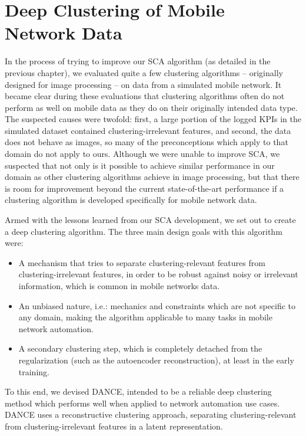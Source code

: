 \chapter{Deep Clustering of Mobile Network Data}
	\label{cha:decorr_ae}
	
	In the process of trying to improve our \ac{SCA} algorithm (as detailed in the previous chapter), we evaluated quite a few clustering algorithms -- originally designed for image processing -- on data from a simulated mobile network.
	It became clear during these evaluations that clustering algorithms often do not perform as well on mobile data as they do on their originally intended data type.
 	The suspected causes were twofold: first, a large portion of the logged \acp{KPI} in the simulated dataset contained clustering-irrelevant features, and second, the data does not behave as images, so many of the preconceptions which apply to that domain do not apply to ours.
	Although we were unable to improve \ac{SCA}, we suspected that not only is it possible to achieve similar performance in our domain as other clustering algorithms achieve in image processing, but that there is room for improvement beyond the current state-of-the-art performance if a clustering algorithm is developed specifically for mobile network data.
	
	Armed with the lessons learned from our \ac{SCA} development, we set out to create a deep clustering algorithm.
	The three main design goals with this algorithm were:
	\begin{itemize}
		\item 
			A mechanism that tries to separate clustering-relevant features from clustering-irrelevant features, in order to be robust against noisy or irrelevant information, which is common in mobile networks data.
		
		\item
			An unbiased nature, i.e.: mechanics and constraints which are not specific to any domain, making the algorithm applicable to many tasks in mobile network automation.
			
		\item
			A secondary clustering step, which is completely detached from the regularization (such as the autoencoder reconstruction), at least in the early training.
	\end{itemize}

	To this end, we devised \ac{DANCE}, intended to be a reliable deep clustering method which performs well when applied to network automation use cases. 
	\ac{DANCE} uses a reconstructive clustering approach, separating clustering-relevant from clustering-irrelevant features in a latent representation.
	
